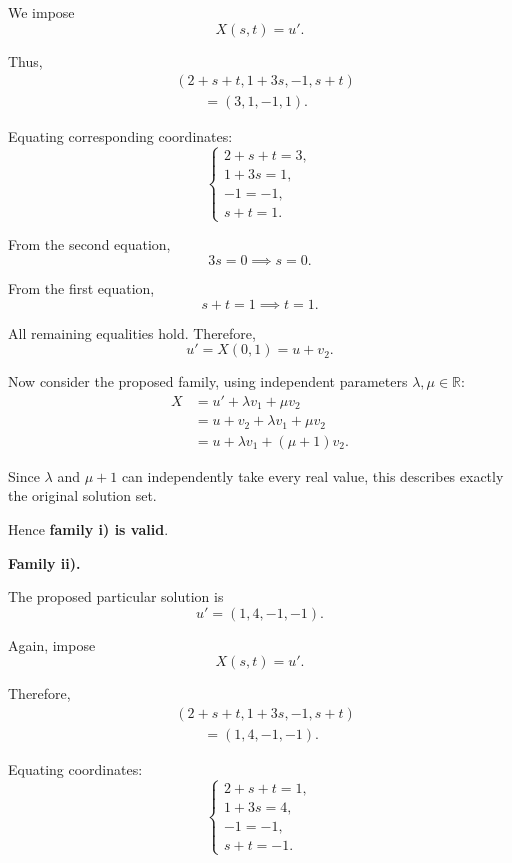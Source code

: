 \begin{enumerate}[label=\alph*)]
\begin{answer}
    We impose
    $$
    X(s,t)=u'.
    $$

    Thus,
    $$
    \begin{aligned}
    &(2+s+t,1+3s,-1,s+t)\\
    &\qquad=(3,1,-1,1).
    \end{aligned}
    $$

    Equating corresponding coordinates:
    $$
    \begin{cases}
    2+s+t=3,\\
    1+3s=1,\\
    -1=-1,\\
    s+t=1.
    \end{cases}
    $$

    From the second equation,
    $$
    3s=0
    \implies s=0.
    $$

    From the first equation,
    $$
    s+t=1
    \implies t=1.
    $$

    All remaining equalities hold.
    Therefore,
    $$
    u'=X(0,1)=u+v_2.
    $$

    Now consider the proposed family, using independent parameters
    $\lambda,\mu\in\mathbb{R}$:
    $$
    \begin{aligned}
    X
    &=u'+\lambda v_1+\mu v_2\\
    &=u+v_2+\lambda v_1+\mu v_2\\
    &=u+\lambda v_1+(\mu+1)v_2.
    \end{aligned}
    $$

    Since $\lambda$ and $\mu+1$ can independently take every real value, this describes
    exactly the original solution set.

    Hence \textbf{family i) is valid}.

    \textbf{Family ii).}

    The proposed particular solution is
    $$
    u'=(1,4,-1,-1).
    $$

    Again, impose
    $$
    X(s,t)=u'.
    $$

    Therefore,
    $$
    \begin{aligned}
    &(2+s+t,1+3s,-1,s+t)\\
    &\qquad=(1,4,-1,-1).
    \end{aligned}
    $$

    Equating coordinates:
    $$
    \begin{cases}
    2+s+t=1,\\
    1+3s=4,\\
    -1=-1,\\
    s+t=-1.
    \end{cases}
    $$


\end{answer}
\end{enumerate}
